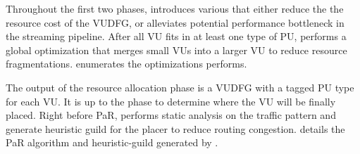 Throughout the first two phases, \name introduces various  that either reduce the
the resource cost of the VUDFG, or alleviates potential performance bottleneck in the streaming
pipeline.
After all VU fits in at least one type of PU, \name performs a global optimization that merges small VUs into a larger VU to reduce resource fragmentations.
 enumerates the optimizations \name performs.

The output of the resource allocation phase is a VUDFG with a tagged PU type for each VU.
It is up to the
 phase to determine where the VU will be finally placed.
Right before PaR, \name performs static analysis on the traffic pattern and generate heuristic guild
for the placer to reduce routing congestion.
 details the PaR algorithm and heuristic-guild generated by \name.

